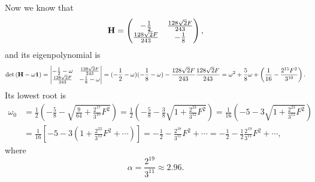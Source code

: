 \documentclass[a4paper]{book}
\newcounter{solution}[chapter]
\renewcommand\det[1]{\mathrm{det\left(#1\right)}}
\newcommand{\I}{{\bf 1}}
\begin{document}
\begin{solution}
 	Now we know that
 	\[
 		{\bf H} = \begin{pmatrix}
 			-\frac{1}{2} & \frac{ 128\sqrt{2} F }{ 243 } \\
 			\frac{ 128\sqrt{2} F }{ 243 } & -\frac{1}{8}
 		\end{pmatrix},
 	\]
 	and its eigenpolynomial is
 	\[
 		\det{{\bf H} - \omega \I} = \begin{vmatrix}
 			-\frac{1}{2} - \omega & \frac{ 128\sqrt{2} F }{ 243 } \\
 			\frac{ 128\sqrt{2} F }{ 243 } & -\frac{1}{8} - \omega
 		\end{vmatrix} = ( -\frac{1}{2} - \omega ) ( -\frac{1}{8} - \omega ) - \frac{ 128\sqrt{2} F }{ 243 } \frac{ 128\sqrt{2} F }{ 243 } = \omega^2 + \frac{5}{8} \omega + \left( \frac{1}{16} - \frac{ 2^{15} F^2 }{ 3^{10} } \right) .
 	\]
	Its lowest root is
	\begin{align*}
		\omega_0 &= \frac{1}{2} \left( - \frac{5}{8} - \sqrt{ \frac{9}{64} + \frac{ 2^{17} }{ 3^{10} } F^2 } \right) = \frac{1}{2} \left( - \frac{5}{8} - \frac{3}{8} \sqrt{ 1 + \frac{ 2^{23} }{ 3^{12} } F^2 } \right) = \frac{1}{16} \left( - 5 - 3 \sqrt{ 1 + \frac{ 2^{23} }{ 3^{12} } F^2 } \right) \\
		&= \frac{1}{16} \left[ - 5 - 3 \left( 1 + \frac{ 2^{22} }{ 3^{12} } F^2 + \cdots \right) \right] = - \frac{1}{2} - \frac{ 2^{18} }{ 3^{11} } F^2 + \cdots = - \frac{1}{2} - \frac{1}{2} \frac{ 2^{19} }{ 3^{11} } F^2 + \cdots ,
	\end{align*}
	where
	\[
		\alpha = \frac{ 2^{19} }{ 3^{11} } \approx 2.96.
	\]
	
	\end{solution}
	
\end{document}
